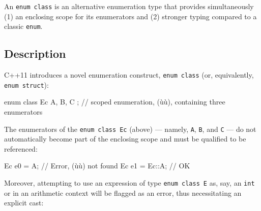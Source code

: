 


\setcounter{table}{0}
\setcounter{footnote}{0}
\setcounter{lstlisting}{0}

An \lstinline!enum!~\lstinline!class! is an alternative enumeration type that provides simultaneously (1) an enclosing scope for its enumerators and (2) stronger typing compared to a classic \lstinline!enum!.

\subsection[Description]{Description}\label{description-enumclass}

C++11 introduces a novel enumeration construct, \lstinline!enum!~\lstinline!class! (or, equivalently, \lstinline!enum!~\lstinline!struct!):

\begin{emcppslisting}
enum class  Ec { A, B, C }; // scoped enumeration, (ù{}ù), containing three enumerators
\end{emcppslisting}

The enumerators of the \lstinline!enum!~\lstinline!class!~\lstinline!Ec! (above) --- namely, \lstinline!A!, \lstinline!B!, and \lstinline!C! --- do not automatically become part of the enclosing scope and must be qualified to be referenced:

\begin{emcppslisting}
Ec e0 = A;      // Error, (ù{}ù) not found
Ec e1 = Ec::A;  // OK
\end{emcppslisting}

Moreover, attempting to use an expression of type \lstinline!enum!~\lstinline!class!~\lstinline!E! as, say, an \lstinline!int! or in an arithmetic context will be flagged as an error, thus necessitating an explicit cast:

